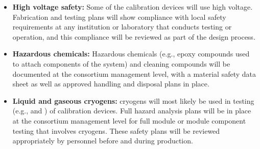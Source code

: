 \begin{itemize}

\item {\bf High voltage safety:} Some of the calibration devices will use high voltage. Fabrication and testing plans will show compliance with local  safety requirements at any institution or laboratory that conducts testing or operation, and this compliance will be reviewed as part of the design process.

\item {\bf Hazardous chemicals:} Hazardous chemicals (e.g., epoxy compounds used to attach components of the system) and cleaning compounds will be documented at the consortium management level, with a material safety data sheet as well as approved handling and disposal plans in place.

\item {\bf Liquid and gaseous cryogens:} cryogens will most likely be used in testing (e.g.,  and ) of calibration devices. Full hazard analysis plans will be in place at the consortium management level for full module or module component testing that involves cryogens. These safety plans will be reviewed appropriately by   personnel before and during production.

\end{itemize}




